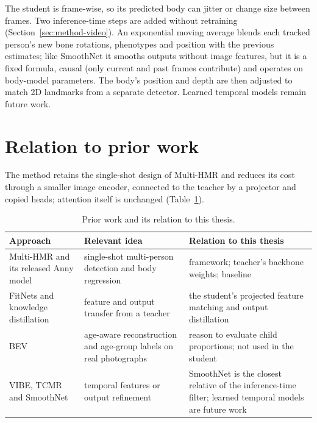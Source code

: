 The student is frame-wise, so its predicted body can jitter or change size between frames. Two inference-time steps
are added without retraining (Section~\ref{sec:method-video}). An exponential moving
average blends each tracked person's new bone rotations, phenotypes and position with the previous estimates; like
SmoothNet it smooths outputs without image features, but it is a fixed formula, causal (only current and past frames
contribute) and operates on body-model parameters. The body's position and depth are then adjusted to match 2D
landmarks from a separate detector. Learned temporal models remain future work.

\section{Relation to prior work}
\label{sec:bg-scope}

The method retains the single-shot design of Multi-HMR and reduces its cost through a smaller image encoder, connected
to the teacher by a projector and copied heads; attention itself is unchanged (Table~\ref{tab:related-position}).

\begin{table}[tbp]
\centering\small
\setlength{\tabcolsep}{3pt}
\begin{tabular}{@{}>{\raggedright}p{3.0cm}>{\raggedright}p{4.3cm}>{\raggedright\arraybackslash}p{5.0cm}@{}}
\toprule
Approach & Relevant idea & Relation to this thesis \\
\midrule
Multi-HMR and its released Anny model \cite{baradel2024multihmr,naver2024multihmrcode} &
single-shot multi-person detection and body regression &
framework; teacher's backbone weights; baseline \\
FitNets and knowledge distillation \cite{romero2015fitnets,hinton2015distilling} &
feature and output transfer from a teacher &
the student's projected feature matching and output distillation \\
BEV \cite{sun2022bev} &
age-aware reconstruction and age-group labels on real photographs &
reason to evaluate child proportions; not used in the student \\
VIBE, TCMR and SmoothNet \cite{kocabas2020vibe,choi2021tcmr,zeng2022smoothnet} &
temporal features or output refinement &
SmoothNet is the closest relative of the inference-time filter; learned temporal models are future work \\
\bottomrule
\end{tabular}
\caption[Prior work and this thesis]{Prior work and its relation to this thesis.}
\label{tab:related-position}
\end{table}

